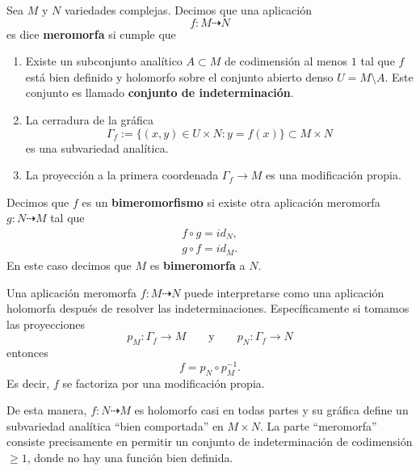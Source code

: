 \begin{definition}
	Sea $M$ y $N$ variedades complejas. Decimos que una aplicación
	\begin{equation*}
		f:M\dashrightarrow N
	\end{equation*}
	es dice \textbf{meromorfa} si cumple que
	\begin{enumerate}
		\item Existe un subconjunto analítico $A\subset M$ de codimensión al menos $1$ tal que $f$ está bien definido y holomorfo sobre el conjunto abierto denso $U=M\setminus A$. Este conjunto es llamado \textbf{conjunto de indeterminación}.
		\item La cerradura de la gráfica
		\begin{equation*}
			\Gamma_f := \{(x,y)\in U\times N : y=f(x)\}\subset M\times N
		\end{equation*}
		es una subvariedad analítica.
		\item La proyección a la primera coordenada $\Gamma_f\to M$ es una modificación propia.
	\end{enumerate}
	Decimos que $f$ es un \textbf{bimeromorfismo} si existe otra aplicación meromorfa $g:N\dashrightarrow M$ tal que
	\begin{align*}
		f\circ g= id_N,\\
		g\circ f= id_M.
	\end{align*}
	En este caso decimos que $M$ es \textbf{bimeromorfa} a $N$.
\end{definition}

Una aplicación meromorfa $f:M\dashrightarrow N$ puede interpretarse como una aplicación holomorfa después de resolver las indeterminaciones. Específicamente si tomamos las proyecciones
\begin{equation*}
	p_M:\Gamma_f\longrightarrow M\qquad\text{y}\qquad p_N:\Gamma_f\longrightarrow N
\end{equation*}
entonces
\begin{equation*}
	f=p_N\circ p_M^{-1}.
\end{equation*}
Es decir, $f$ se factoriza por una modificación propia. 

De esta manera, $f:N\dashrightarrow M$ es holomorfo casi en todas partes y su gráfica define un subvariedad analítica \enquote{bien comportada} en $M\times N$. La parte \enquote{meromorfa} consiste precisamente en permitir un conjunto de indeterminación de codimensión $\geq 1$, donde no hay una función bien definida.

